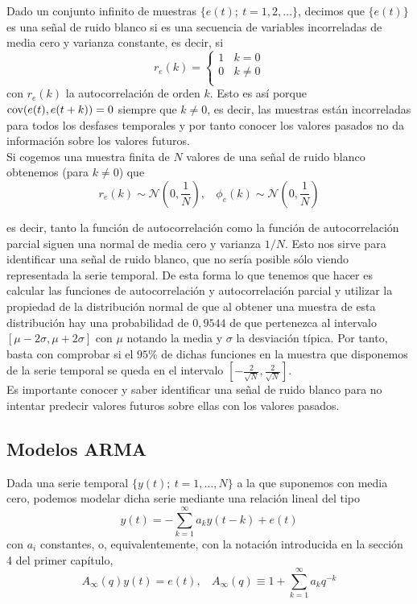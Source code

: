 Dado un conjunto infinito de muestras $\{e(t);\ t=1,2,\dots\}$, decimos que $\{e(t)\}$ es una señal de ruido blanco si es una secuencia de variables incorreladas de media cero y varianza constante, es decir, si
\begin{equation*}
	r_e(k) = 
  \left\lbrace
  \begin{array}{l}
     1 \ \ \ \ k = 0 \\
     0 \ \ \ \ k \neq 0 \\
  \end{array}
  \right.
\end{equation*}
con $r_e(k)$ la autocorrelación de orden $k$. Esto es así porque $\text{cov}{(e(t),e(t+k))} = 0$ siempre que $k \neq 0$, es decir, las muestras están incorreladas para todos los desfases temporales y por tanto conocer los valores pasados no da información sobre los valores futuros.\\
Si cogemos una muestra finita de $N$ valores de una señal de ruido blanco obtenemos (para $k \neq 0$) que
\[	r_e(k) \sim \mathcal{N} \left( 0, \frac{1}{N} \right), \ \ \ \ \phi_e(k) \sim \mathcal{N} \left( 0, \frac{1}{N} \right)	\]

es decir, tanto la función de autocorrelación como la función de autocorrelación parcial siguen una normal de media cero y varianza $1/N$. Esto nos sirve para identificar una señal de ruido blanco, que no sería posible sólo viendo representada la serie temporal. De esta forma lo que tenemos que hacer es calcular las funciones de autocorrelación y autocorrelación parcial y utilizar la propiedad de la distribución normal de que al obtener una muestra de esta distribución hay una probabilidad de $0,9544$ de que pertenezca al intervalo $[\mu - 2 \sigma, \mu + 2 \sigma]$ con $\mu$ notando la media y $\sigma$ la desviación típica. Por tanto, basta con comprobar si el $95\%$ de dichas funciones en la muestra que disponemos de la serie temporal se queda en el intervalo $[- \frac{2}{\sqrt{N}}, \frac{2}{\sqrt{N}}]$.\\

Es importante conocer y saber identificar una señal de ruido blanco para no intentar predecir valores futuros sobre ellas con los valores pasados.

\subsection{Modelos ARMA}

Dada una serie temporal $\{y(t);\ t=1,\dots,N\}$ a la que suponemos con media cero, podemos modelar dicha serie mediante una relación lineal del tipo
\[	y(t) = - \sum_{k=1}^{\infty} a_k y(t-k) + e(t) \]
con $a_i$ constantes, o, equivalentemente, con la notación introducida en la sección 4 del primer capítulo,
\[	A_{\infty}(q)y(t) = e(t), \ \ \ \ A_{\infty}(q) \equiv 1 + \sum_{k=1}^{\infty} a_k q^{-k}	\]

